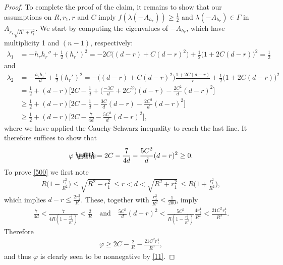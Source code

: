 \documentclass[10pt,a4paper]{amsart}
\makeatletter
\newcommand*{\defeq}{\mathrel{\rlap{%
			\raisebox{0.3ex}{$\m@th\cdot$}}%
		\raisebox{-0.3ex}{$\m@th\cdot$}}%
	=}
\renewcommand{\phi}{\varphi}
\makeatother
\begin{document}
\begin{proof}
	To complete the proof of the claim, it remains to show that our assumptions on $R, r_1, r$ and $C$ imply $f(\lambda(-A_{h_{r}})) \geq \frac{1}{2}$ and $\lambda(-A_{h_{r}})\in\Gamma$ in $A_{r, \sqrt{R^2 + r_1^2}}$. We start by computing the eigenvalues of $-A_{h_{r}}$, which have multiplicity 1 and $(n-1)$, respectively: 
	\begin{align*}
	\lambda_1 & = -h_{r}h_{r}'' + \frac{1}{2}(h_{r}')^2 = -2C\big((d-r) + C(d-r)^2\big) + \frac{1}{2}\big(1+2C(d-r)\big)^2 = \frac{1}{2}
	\end{align*}
	and
	\begin{align*}
	\lambda_2 & = -\frac{h_{r}h_{r}'}{d} + \frac{1}{2}(h_{r}')^2   = -\big((d-r) + C(d-r)^2\big)\frac{1+2C(d-r)}{r}+ \frac{1}{2}\big(1+2C(d-r)\big)^2 \nonumber \\
	& = \frac{1}{2} + (d-r)\bigg[2C -\frac{1}{d} + \Big(\frac{-3C}{d} + 2C^2\Big)(d-r) - \frac{2C^2}{d}(d-r)^2\bigg] \nonumber \\
	& \geq \frac{1}{2} + (d-r)\bigg[2C -\frac{1}{d} -\frac{3C}{d}(d-r) - \frac{2C^2}{d}(d-r)^2\bigg] \nonumber \\
	& \geq \frac{1}{2} + (d-r)\bigg[2C -\frac{7}{4d} - \frac{5C^2}{d}(d-r)^2\bigg],
	\end{align*}
	where we have applied the Cauchy-Schwarz inequality to reach the last line. It therefore suffices to show that
	\begin{align}\label{500}
	\phi \defeq 2C -\frac{7}{4d} - \frac{5C^2}{d}(d-r)^2  \geq 0. 
	\end{align} 
	To prove \eqref{500} we first note
	\begin{align*}
	R\bigg(1-\frac{r_1^2}{R^2}\bigg) \leq \sqrt{R^2 - r_1^2}\, \leq r < d < \sqrt{R^2 + r_1^2} \, \leq R\bigg(1+\frac{r_1^2}{R^2}\bigg),
	\end{align*} 
	which implies $d-r \leq \frac{2r_1^2}{R}$. These, together with $\frac{r_1^2}{R^2} < \frac{1}{200}$, imply
	\begin{align*}
	\frac{7}{4d} < \frac{7}{4R(1-\frac{r_1^2}{R^2})} < \frac{2}{R} \quad \text{and}\quad 	\frac{5C^2}{d}(d-r)^2 < \frac{5C^2}{R(1-\frac{r_1^2}{R^2})}\frac{4r_1^4}{R^2} < \frac{21C^2 r_1^4}{R^3}. 
	\end{align*}
	Therefore 
	\begin{align*}
	\phi \geq 2C - \frac{2}{R} - \frac{21C^2 r_1^4}{R^3},
	\end{align*}
	and thus $\phi$ is clearly seen to be nonnegative by \eqref{11}. 
\end{proof}
\end{document}
